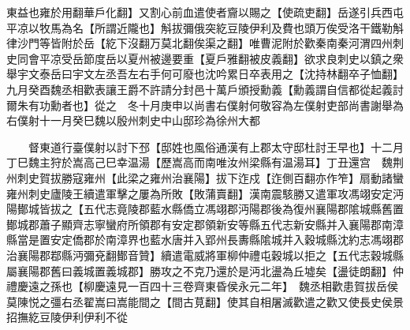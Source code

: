 東益也雍於用翻華戶化翻】又割心前血遣使者齎以賜之【使疏吏翻】岳遂引兵西屯平凉以牧馬為名【所謂近隴也】斛拔彌俄突紇豆陵伊利及費也頭万俟受洛干鐵勒斛律沙門等皆附於岳【紇下沒翻万莫北翻俟渠之翻】唯曹泥附於歡秦南秦河渭四州刺史同會平凉受岳節度岳以夏州被邊要重【夏戶雅翻被皮義翻】欲求良刺史以鎮之衆舉宇文泰岳曰宇文左丞吾左右手何可廢也沈吟累日卒表用之【沈持林翻卒子恤翻】　九月癸酉魏丞相歡表讓王爵不許請分封邑十萬戶頒授勳義【勳義謂自信都從起義討爾朱有功勳者也】從之　冬十月庚申以尚書右僕射何敬容為左僕射吏部尚書謝舉為右僕射十一月癸巳魏以殷州刺史中山邸珍為徐州大都

　　督東道行臺僕射以討下邳【邸姓也風俗通漢有上郡太守邸杜討王早也】十二月丁巳魏主狩於嵩高己巳幸温湯【歷嵩高而南唯汝州梁縣有温湯耳】丁丑還宫　魏荆州刺史賀拔勝寇雍州【此梁之雍州治襄陽】拔下迮戍【迮側百翻亦作笮】扇動諸蠻雍州刺史廬陵王續遣軍擊之屢為所敗【敗蒲賣翻】漢南震駭勝又遣軍攻馮翊安定沔陽鄼城皆拔之【五代志竟陵郡藍水縣僑立馮翊郡沔陽郡後為復州襄陽郡隂城縣舊置鄼城郡蕭子顯齊志寧蠻府所領郡有安定郡領新安等縣五代志新安縣并入襄陽郡南漳縣當是置安定僑郡於南漳界也藍水唐并入郢州長夀縣隂城并入穀城縣沈約志馮翊郡治襄陽郡鄀縣沔彌兗翻鄼音贊】續遣電威將軍柳仲禮屯穀城以拒之【五代志穀城縣屬襄陽郡舊曰義城置義城郡】勝攻之不克乃還於是沔北盪為丘墟矣【盪徒朗翻】仲禮慶遠之孫也【柳慶遠見一百四十三卷齊東昏侯永元二年】　魏丞相歡患賀拔岳侯莫陳悦之彊右丞翟嵩曰嵩能間之【間古莧翻】使其自相屠滅歡遣之歡又使長史侯景招撫紇豆陵伊利伊利不從

